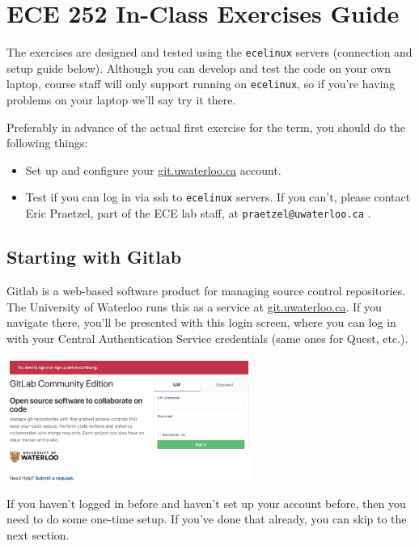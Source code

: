



\section*{ECE 252 In-Class Exercises Guide}

The exercises are designed and tested using the \texttt{ecelinux} servers (connection and setup guide below). Although you can develop and test the code on your own laptop, course staff will only support running on \texttt{ecelinux}, so if you're having problems on your laptop we'll say try it there. 

Preferably in advance of the actual first exercise for the term, you should do the following things:
\begin{itemize}
	\item Set up and configure your \url{git.uwaterloo.ca} account.
	\item Test if you can log in via ssh to \texttt{ecelinux} servers. If you can't, please contact Eric Praetzel, part of the ECE lab staff,  at \texttt{praetzel@uwaterloo.ca} .
\end{itemize}

\subsection*{Starting with Gitlab}
Gitlab is a web-based software product for managing source control repositories. The University of Waterloo runs this as a service at \url{git.uwaterloo.ca}. If you navigate there, you'll be presented with this login screen, where you can log in with your Central Authentication Service credentials (same ones for Quest, etc.). 

\begin{center}
	\includegraphics[width=0.6\textwidth]{images/gitlab-login.png}
\end{center}

If you haven't logged in before and haven't set up your account before, then you need to do some one-time setup. If you've done that already, you can skip to the next section.

